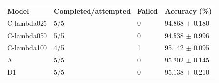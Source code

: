 \begin{tabular}{llll}
\toprule
Model & Completed/attempted & Failed & Accuracy (\%) \\
\midrule
C-lambda025 & 5/5 & 0 & 94.868 $\pm$ 0.180 \\
C-lambda050 & 5/5 & 0 & 94.538 $\pm$ 0.996 \\
C-lambda100 & 4/5 & 1 & 95.142 $\pm$ 0.095 \\
A & 5/5 & 0 & 95.202 $\pm$ 0.145 \\
D1 & 5/5 & 0 & 95.138 $\pm$ 0.210 \\
\bottomrule
\end{tabular}
